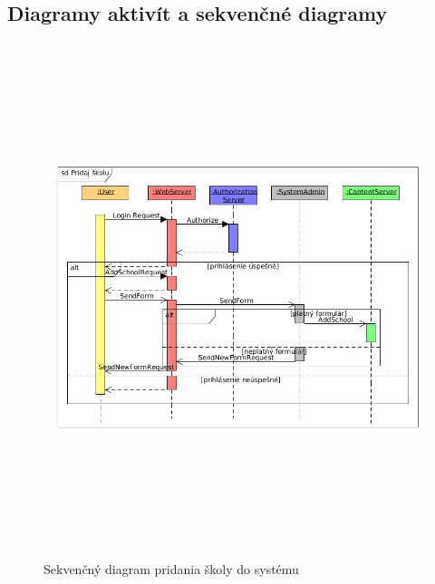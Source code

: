\documentclass[slovak, 12pt, Times New Roman]{article}
\begin{document}
		\subsection{Diagramy aktivít a sekvenčné diagramy}
			\begin{figure}[!htb]
				\centering
				\includegraphics[width = 16cm, height = 15cm]{AddSchoolSequence.jpg}
				\caption{Sekvenčný diagram pridania školy do systému}
				\label{fig:Reinforcement}
			\end{figure}
\end{document}
